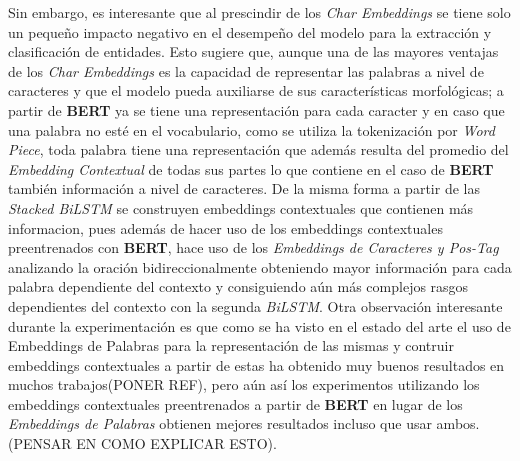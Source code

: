 Sin embargo, es interesante que al prescindir de los \emph{Char Embeddings} se tiene solo un peque\~no impacto negativo en el desempe\~no del modelo para la extracci\'on y clasificaci\'on de entidades. Esto sugiere que, aunque una de las mayores ventajas de los \emph{Char Embeddings} es la capacidad de representar las palabras a nivel de caracteres y que el modelo pueda auxiliarse de sus caracter\'isticas morfol\'ogicas; a partir de \textbf{BERT} ya se tiene una representaci\'on para cada caracter y en caso que una palabra no est\'e en el vocabulario, como se utiliza la tokenizaci\'on por \emph{Word Piece}, toda palabra tiene una representaci\'on que adem\'as resulta del promedio del \emph{Embedding Contextual} de todas sus partes lo que contiene en el caso de \textbf{BERT} tambi\'en informaci\'on a nivel de caracteres. De la misma forma a partir de las \emph{Stacked BiLSTM} se construyen embeddings contextuales que contienen m\'as informacion, pues adem\'as de hacer uso de los embeddings contextuales preentrenados con \textbf{BERT}, hace uso de los \emph{Embeddings de Caracteres y Pos-Tag} analizando la oraci\'on bidireccionalmente obteniendo mayor informaci\'on para cada palabra dependiente del contexto y consiguiendo a\'un m\'as complejos rasgos dependientes del contexto con la segunda \emph{BiLSTM}. Otra observaci\'on interesante durante la experimentaci\'on es que como se ha visto en el estado del arte el uso de Embeddings de Palabras para la representaci\'on de las mismas y contruir embeddings contextuales a partir de estas ha obtenido muy buenos resultados en muchos trabajos(PONER REF), pero a\'un as\'i los experimentos utilizando los embeddings contextuales preentrenados a partir de \textbf{BERT} en lugar de los \emph{Embeddings de Palabras} obtienen mejores resultados incluso que usar ambos.(PENSAR EN COMO EXPLICAR ESTO).









